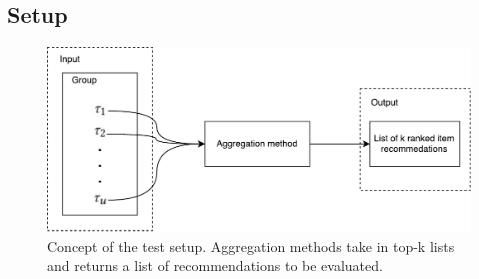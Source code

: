\subsection{Setup}\label{sec:setup}

\begin{figure}[h]
	\centering
	\includegraphics[scale=.4]{graphics/setup}
	\caption{Concept of the test setup. Aggregation methods take in top-k lists and returns a list of recommendations to be evaluated.}
	\label{fig:setup}
\end{figure}





